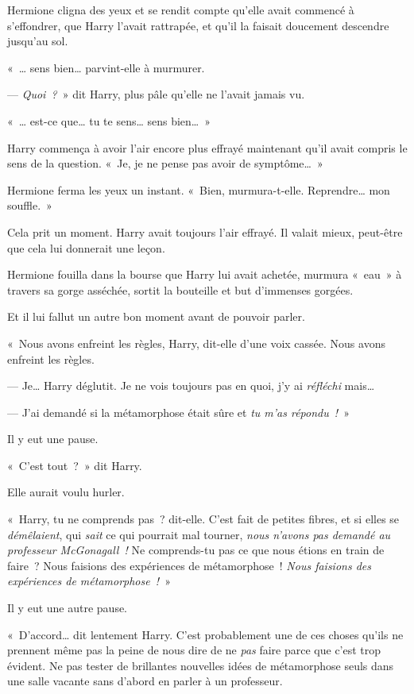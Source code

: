 Hermione cligna des yeux et se rendit compte qu'elle avait commencé à s'effondrer, que Harry l'avait rattrapée, et qu'il la faisait doucement descendre jusqu'au sol.

«~… sens bien… parvint-elle à murmurer.

--- \emph{Quoi~?}~» dit Harry, plus pâle qu'elle ne l'avait jamais vu.

«~… est-ce que… tu te sens… sens bien…~»

Harry commença à avoir l'air encore plus effrayé maintenant qu'il avait compris le sens de la question.
«~Je, je ne pense pas avoir de symptôme…~»

Hermione ferma les yeux un instant.
«~Bien, murmura-t-elle.
Reprendre… mon souffle.~»

Cela prit un moment.
Harry avait toujours l'air effrayé.
Il valait mieux, peut-être que cela lui donnerait une leçon.

Hermione fouilla dans la bourse que Harry lui avait achetée, murmura «~eau~» à travers sa gorge asséchée, sortit la bouteille et but d'immenses gorgées.

Et il lui fallut un autre bon moment avant de pouvoir parler.

«~Nous avons enfreint les règles, Harry, dit-elle d'une voix cassée.
Nous avons enfreint les règles.

--- Je… Harry déglutit.
Je ne vois toujours pas en quoi, j'y ai \emph{réfléchi} mais…

--- J'ai demandé si la métamorphose était sûre et \emph{tu m'as répondu~!}~»

Il y eut une pause.

«~C'est tout~?~»
dit Harry.

Elle aurait voulu hurler.

«~Harry, tu ne comprends pas~? dit-elle.
C'est fait de petites fibres, et si elles se \emph{démêlaient}, qui \emph{sait} ce qui pourrait mal tourner, \emph{nous n'avons pas demandé au professeur McGonagall~!} Ne comprends-tu pas ce que nous étions en train de faire~?
Nous faisions des expériences de métamorphose~!
\emph{Nous faisions des expériences de métamorphose~!}~»

Il y eut une autre pause.

«~D'accord… dit lentement Harry.
C'est probablement une de ces choses qu'ils ne prennent même pas la peine de nous dire de ne \emph{pas} faire parce que c'est trop évident.
Ne pas tester de brillantes nouvelles idées de métamorphose seuls dans une salle vacante sans d'abord en parler à un professeur.

